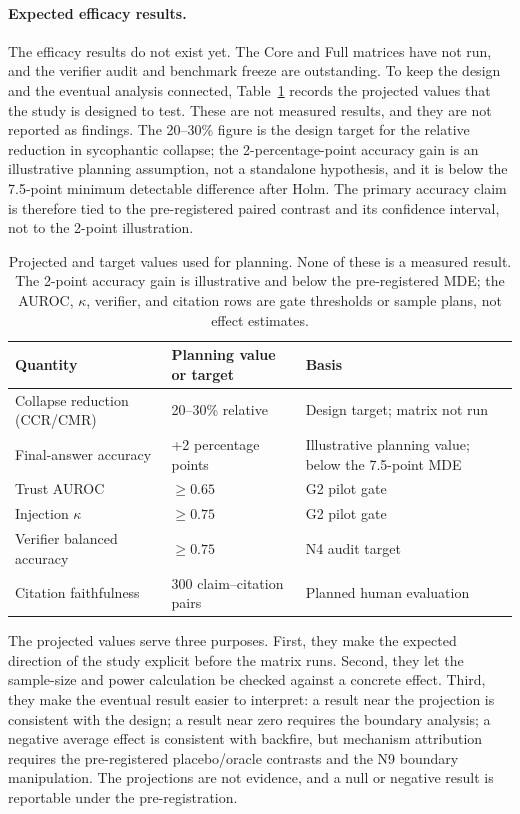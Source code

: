 \paragraph*{Expected efficacy results.}
The efficacy results do not exist yet. The Core and Full matrices have not run, and the verifier audit and benchmark freeze are outstanding. To keep the design and the eventual analysis connected, Table~\ref{tab:expected-results} records the projected values that the study is designed to test. These are not measured results, and they are not reported as findings. The 20--30\% figure is the design target for the relative reduction in sycophantic collapse; the 2-percentage-point accuracy gain is an illustrative planning assumption, not a standalone hypothesis, and it is below the 7.5-point minimum detectable difference after Holm. The primary accuracy claim is therefore tied to the pre-registered paired contrast and its confidence interval, not to the 2-point illustration.

\begin{table}[H]
  \centering
  \caption{Projected and target values used for planning. None of these is a measured result. The 2-point accuracy gain is illustrative and below the pre-registered MDE; the AUROC, $\kappa$, verifier, and citation rows are gate thresholds or sample plans, not effect estimates.}
  \renewcommand{\arraystretch}{1.25}
  \small
  \begin{tabular}{|p{}|p{}|p{}|}
    \hline
    Quantity & Planning value or target & Basis \\
    \hline
    Collapse reduction (CCR/CMR) & 20--30\% relative & Design target; matrix not run \\
    \hline
    Final-answer accuracy & +2 percentage points & Illustrative planning value; below the 7.5-point MDE \\
    \hline
    Trust AUROC & $\ge0.65$ & G2 pilot gate \\
    \hline
    Injection $\kappa$ & $\ge0.75$ & G2 pilot gate \\
    \hline
    Verifier balanced accuracy & $\ge0.75$ & N4 audit target \\
    \hline
    Citation faithfulness & 300 claim--citation pairs & Planned human evaluation \\
    \hline
  \end{tabular}
  \label{tab:expected-results}
\end{table}

The projected values serve three purposes. First, they make the expected direction of the study explicit before the matrix runs. Second, they let the sample-size and power calculation be checked against a concrete effect. Third, they make the eventual result easier to interpret: a result near the projection is consistent with the design; a result near zero requires the boundary analysis; a negative average effect is consistent with backfire, but mechanism attribution requires the pre-registered placebo/oracle contrasts and the N9 boundary manipulation. The projections are not evidence, and a null or negative result is reportable under the pre-registration.


